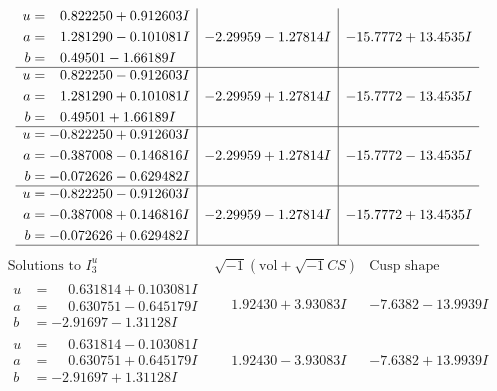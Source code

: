 \documentclass[1p]{elsarticle_modified}
\theoremstyle{definition}
\newcommand{\I}{\sqrt{-1}}
\begin{document}
$$\begin{array}{c|c|c}
\begin{aligned}
u &= \phantom{-}0.822250 + 0.912603 I \\
a &= \phantom{-}1.281290 - 0.101081 I \\
b &= \phantom{-}0.49501 - 1.66189 I\end{aligned}
 & -2.29959 - 1.27814 I & -15.7772 + 13.4535 I \\ \hline\begin{aligned}
u &= \phantom{-}0.822250 - 0.912603 I \\
a &= \phantom{-}1.281290 + 0.101081 I \\
b &= \phantom{-}0.49501 + 1.66189 I\end{aligned}
 & -2.29959 + 1.27814 I & -15.7772 - 13.4535 I \\ \hline\begin{aligned}
u &= -0.822250 + 0.912603 I \\
a &= -0.387008 - 0.146816 I \\
b &= -0.072626 - 0.629482 I\end{aligned}
 & -2.29959 + 1.27814 I & -15.7772 - 13.4535 I \\ \hline\begin{aligned}
u &= -0.822250 - 0.912603 I \\
a &= -0.387008 + 0.146816 I \\
b &= -0.072626 + 0.629482 I\end{aligned}
 & -2.29959 - 1.27814 I & -15.7772 + 13.4535 I\\
 \hline 
 \end{array}$$\newpage$$\begin{array}{c|c|c}  
\text{Solutions to }I^u_{3}& \I (\text{vol} + \sqrt{-1}CS) & \text{Cusp shape}\\
 \hline 
\begin{aligned}
u &= \phantom{-}0.631814 + 0.103081 I \\
a &= \phantom{-}0.630751 - 0.645179 I \\
b &= -2.91697 - 1.31128 I\end{aligned}
 & \phantom{-}1.92430 + 3.93083 I & -7.6382 - 13.9939 I \\ \hline\begin{aligned}
u &= \phantom{-}0.631814 - 0.103081 I \\
a &= \phantom{-}0.630751 + 0.645179 I \\
b &= -2.91697 + 1.31128 I\end{aligned}
 & \phantom{-}1.92430 - 3.93083 I & -7.6382 + 13.9939 I \\ \hline\begin{aligned}

\end{aligned}
\end{array}$$
\end{document}

